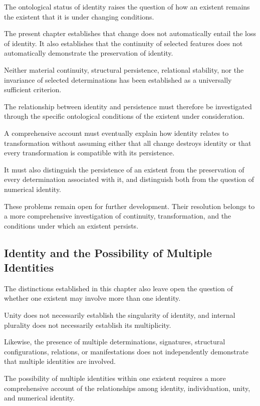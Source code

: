 The ontological status of identity raises the
question of how an existent remains the existent
that it is under changing conditions.

The present chapter establishes that change does
not automatically entail the loss of identity.
It also establishes that the continuity of selected
features does not automatically demonstrate the
preservation of identity.

Neither material continuity, structural persistence,
relational stability, nor the invariance of selected
determinations has been established as a universally
sufficient criterion.

The relationship between identity and persistence
must therefore be investigated through the specific
ontological conditions of the existent under
consideration.

A comprehensive account must eventually explain
how identity relates to transformation without
assuming either that all change destroys identity
or that every transformation is compatible with
its persistence.

It must also distinguish the persistence of an
existent from the preservation of every determination
associated with it, and distinguish both from
the question of numerical identity.

These problems remain open for further development.
Their resolution belongs to a more comprehensive
investigation of continuity, transformation, and
the conditions under which an existent persists.

\subsection{Identity and the Possibility of Multiple Identities}

The distinctions established in this chapter also
leave open the question of whether one existent may
involve more than one identity.

Unity does not necessarily establish the singularity
of identity, and internal plurality does not
necessarily establish its multiplicity.

Likewise, the presence of multiple determinations,
signatures, structural configurations, relations,
or manifestations does not independently demonstrate
that multiple identities are involved.

The possibility of multiple identities within one
existent requires a more comprehensive account of
the relationships among identity, individuation,
unity, and numerical identity.

